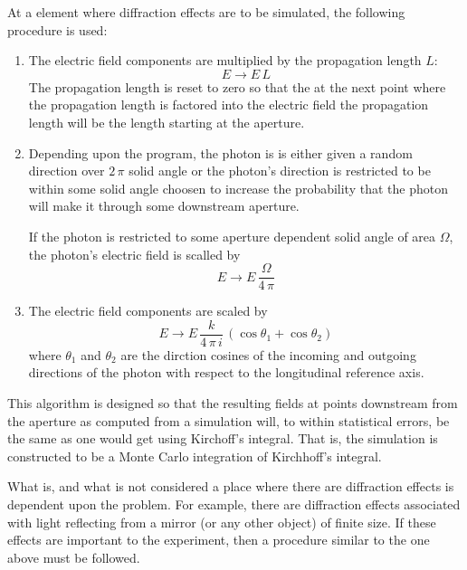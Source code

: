 At a  element where diffraction effects are to
be simulated, the following procedure is used:
  \begin{enumerate}
  \item
The electric field components are multiplied by the propagation length $L$:
\begin{equation}
  E \rightarrow E \, L
\end{equation}
The propagation length is reset to zero so that the at the next point
where the propagation length is factored into the electric field the
propagation length will be the length starting at the aperture.
  \item
Depending upon the program, the photon is is either given a random
direction over $2 \, \pi$ solid angle or the photon's direction
is restricted to be within some solid angle choosen to increase
the probability that the photon will make it through some downstream aperture.

If the photon is restricted to some aperture dependent solid angle of area $\Omega$,
the photon's electric field is scalled by
\begin{equation}
  E \rightarrow E \, \frac{\Omega}{4 \, \pi}
  \label{eeo4p}
\end{equation}

  \item
The electric field components are scaled by
\begin{equation}
  E \rightarrow E \, \frac{k}{4 \, \pi \, i} \, (\cos\theta_1 + \cos\theta_2)
  \label{eek4p}
\end{equation}
where $\theta_1$ and $\theta_2$ are the dirction cosines of the
incoming and outgoing directions of the photon with respect to the
longitudinal reference axis.
  \end{enumerate}
This algorithm is designed so that the resulting fields at points
downstream from the aperture as computed from a simulation will, to
within statistical errors, be the same as one would get using
Kirchoff's integral. That is, the simulation is constructed to be a
Monte Carlo integration of Kirchhoff's integral.

What is, and what is not considered a place where there are
diffraction effects is dependent upon the problem. For example, there
are diffraction effects associated with light reflecting from a mirror
(or any other object) of finite size. If these effects are important
to the experiment, then a procedure similar to the one above must be
followed. 

